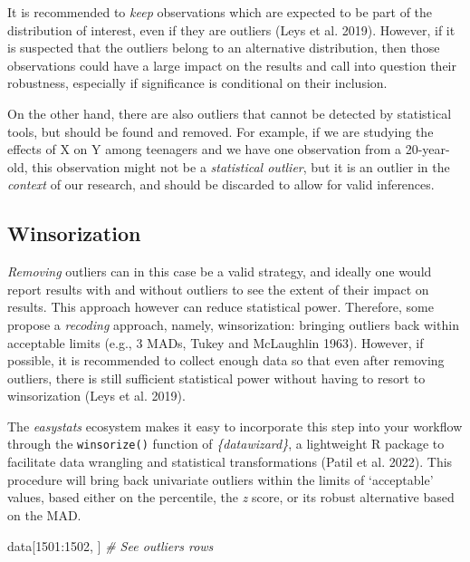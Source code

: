 \documentclass{article}
\newenvironment{Shaded}{\begin{snugshade}}{\end{snugshade}}
\newcommand{\CommentTok}[1]{\textcolor[rgb]{0.56,0.35,0.01}{\textit{#1}}}
\newcommand{\DecValTok}[1]{\textcolor[rgb]{0.00,0.00,0.81}{#1}}
\newcommand{\NormalTok}[1]{#1}
\newcommand{\SpecialCharTok}[1]{\textcolor[rgb]{0.00,0.00,0.00}{#1}}
\begin{document}
It is recommended to \emph{keep} observations which are expected to be
part of the distribution of interest, even if they are outliers (Leys et
al. 2019). However, if it is suspected that the outliers belong to an
alternative distribution, then those observations could have a large
impact on the results and call into question their robustness,
especially if significance is conditional on their inclusion.

On the other hand, there are also outliers that cannot be detected by
statistical tools, but should be found and removed. For example, if we
are studying the effects of X on Y among teenagers and we have one
observation from a 20-year-old, this observation might not be a
\emph{statistical outlier}, but it is an outlier in the \emph{context}
of our research, and should be discarded to allow for valid inferences.

\hypertarget{winsorization}{%
\subsection{Winsorization}\label{winsorization}}

\emph{Removing} outliers can in this case be a valid strategy, and
ideally one would report results with and without outliers to see the
extent of their impact on results. This approach however can reduce
statistical power. Therefore, some propose a \emph{recoding} approach,
namely, winsorization: bringing outliers back within acceptable limits
(e.g., 3 MADs, Tukey and McLaughlin 1963). However, if possible, it is
recommended to collect enough data so that even after removing outliers,
there is still sufficient statistical power without having to resort to
winsorization (Leys et al. 2019).

The \emph{easystats} ecosystem makes it easy to incorporate this step
into your workflow through the \texttt{winsorize()} function of
\emph{\{datawizard\}}, a lightweight R package to facilitate data
wrangling and statistical transformations (Patil et al. 2022). This
procedure will bring back univariate outliers within the limits of
`acceptable' values, based either on the percentile, the \emph{z} score,
or its robust alternative based on the MAD.

\begin{Shaded}
\begin{Highlighting}[]
\NormalTok{data[}\DecValTok{1501}\SpecialCharTok{:}\DecValTok{1502}\NormalTok{, ]  }\CommentTok{\# See outliers rows}
\end{Highlighting}
\end{Shaded}
\end{document}
